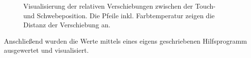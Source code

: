 \documentclass[12pt,numbers=noenddot,parskip,bibliography=totocnumbered,listof=totocnumbered]{scrreprt}
\begin{document}
\begin{figure}
\centering
{}
\hfill
{}
\caption{Visualisierung der relativen Verschiebungen zwischen der Touch- und Schwebeposition. Die Pfeile inkl. Farbtemperatur zeigen die Distanz der Verschiebung an.}
\label{klickschwebepositionen}
\end{figure}
Anschließend wurden die Werte mittels eines eigens geschriebenen Hilfsprogramm ausgewertet und visualisiert.
\end{document}
